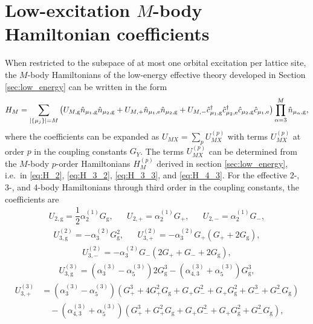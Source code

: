 \documentclass[preprint,showkeys,nofootinbib]{revtex4-1}
\newcommand{\f}{\dfrac} %
\newcommand{\p}[1]{\left(#1\right)} %
\renewcommand{\set}[1]{\left\{#1\right\}} %
\newcommand{\g}{\text{g}}
\newcommand{\e}{\text{e}}
\renewcommand{\c}{\hat{c}}
\newcommand{\n}{\hat{n}}
\newcommand{\1}{\mathds{1}}
\begin{document}
\section{Low-excitation $M$-body Hamiltonian coefficients}
\label{sec:U_X}

When restricted to the subspace of at most one orbital excitation per
lattice site, the $M$-body Hamiltonians of the low-energy effective
theory developed in Section \ref{sec:low_energy} can be written in the
form
\begin{align}
  H_M = \sum_{\abs{\set{\mu_j}}=M}
  \p{U_{M,\g} \n_{\mu_1,\g} \n_{\mu_2,\g}
    + U_{M,+} \n_{\mu_1,\e} \n_{\mu_2,\g}
    + U_{M,-} \c_{\mu_1,\g}^\dag \c_{\mu_2,\e}^\dag
    \c_{\mu_2,\g} \c_{\mu_1,\e}}
  \prod_{\alpha=3}^M \n_{\mu_\alpha,\g},
\end{align}
where the coefficients can be expanded as
$U_{MX} = \sum_p U_{MX}^{(p)}$ with terms $U_{MX}^{(p)}$ at order $p$
in the coupling constants $G_Y$.  The terms $U_{MX}^{(p)}$ can be
determined from the $M$-body $p$-order Hamiltonians $H_M^{(p)}$
derived in section \ref{sec:low_energy}, i.e.~in \eqref{eq:H_2},
\eqref{eq:H_3_2}, \eqref{eq:H_3_3}, and \eqref{eq:H_4_3}.  For the
effective 2-, 3-, and 4-body Hamiltonians through third order in the
coupling constants, the coefficients are
\begin{align}
  U_{2,\g} = \f12 \alpha_2^{(1)} G_\g,
  &&
  U_{2,+} = \alpha_2^{(1)} G_+,
  &&
  U_{2,-} = \alpha_2^{(1)} G_-,
\end{align}
\begin{align}
  U_{3,\g}^{(2)} = - \alpha_3^{(2)} G_\g^2,
  &&
  U_{3,+}^{(2)} = - \alpha_3^{(2)} G_+ \p{G_+ + 2 G_\g},
\end{align}
\begin{align}
  U_{3,-}^{(2)} = - \alpha_3^{(2)} G_- \p{2 G_+ + G_- + 2 G_\g},
\end{align}
\begin{align}
  U_{3,\g}^{(3)}
  = \p{\alpha_3^{(3)} - \alpha_5^{(3)}} 2 G_\g^3
  - \p{\alpha_{4,3}^{(3)} + \alpha_5^{(3)}} G_\g^3,
\end{align}
\begin{align}
  U_{3,+}^{(3)}
  &= \p{\alpha_3^{(3)} - \alpha_5^{(3)}} \p{G_+^3 + 4 G_+^2 G_\g
    + G_+ G_-^2 + G_+ G_\g^2 + G_-^3 + G_-^2 G_\g} \nonumber \\
  &\quad - \p{\alpha_{4,3}^{(3)} + \alpha_5^{(3)}}
  \p{G_+^3 + G_+^2 G_\g + G_+ G_-^2 + G_+ G_\g^2 + G_-^2 G_\g},
\end{align}
\end{document}
